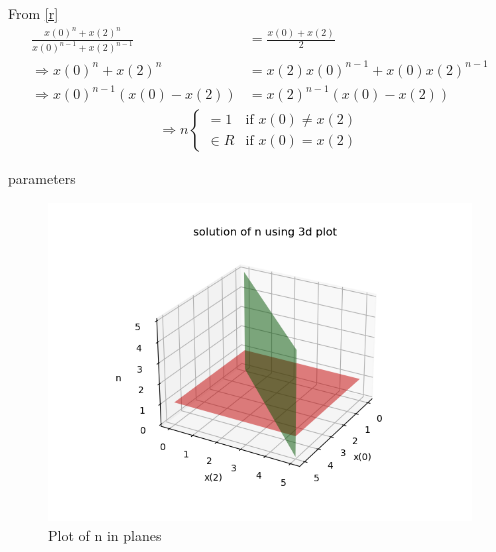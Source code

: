 \documentclass[journal,12pt,twocolumn]{IEEEtran}
\theoremstyle{remark}
\begin{document}
From \eqref{r}
\begin{align}
    \frac{x(0)^n +x(2)^n}{x(0)^{n-1} + x(2)^{n-1}}&= \frac{x(0)+x(2)}{2}  \\
    \Rightarrow x(0)^n+x(2)^n&=x(2)x(0)^{n-1}+x(0)x(2)^{n-1} \\
    \Rightarrow x(0)^{n-1}(x(0)-x(2))&=x(2)^{n-1}(x(0)-x(2))\label{2}
 \end{align}
\begin{align}
	\Rightarrow n
	\begin{cases}
		=1  &\text{if } x(0)\neq x(2)\\
		\in R &\text{if } x(0)=x(2)
	\end{cases}
\end{align}
\begin{table}[h!]
	
	\caption{parameters}
\end{table}
\begin{figure}[h]
\centering
\includegraphics[width=2\columnwidth]{figures/plane.png}
\caption{Plot of n in planes}
\label{solution}
\end{figure}

 
\end{document}
